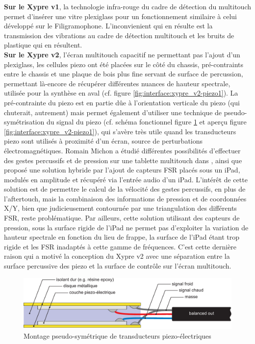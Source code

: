 \indent \textbf{Sur le Xypre v1}, la technologie infra-rouge du cadre de détection du multitouch permet d'insérer une vitre plexiglass pour un fonctionnement similaire à celui développé sur le Filigramophone. L'inconvienient qui en résulte est la transmission des vibrations au cadre de détection multitouch et les bruits de plastique qui en résultent.\\
\indent \textbf{Sur le Xypre v2}, l'écran multitouch capacitif ne permettant pas l'ajout d'un plexiglass, les cellules piezo ont été placées sur le côté du chassis, pré-contraints entre le chassis et une plaque de bois plus fine servant de surface de percussion, permettant là-encore de récupérer différentes nuances de hauteur spectrale, utilisée pour la synthèse en aval (cf. figure \ref{fig:interface:xypre_v2-piezo1}). La pré-contrainte du piezo est en partie dûe à l'orientation verticale du piezo (qui chuterait, autrement) mais permet également d'utiliser une technique de pseudo-symétrisation du signal du piezo (cf. schéma fonctionnel figure \ref{fig:interface:balancedPiezo} et aperçu figure \ref{fig:interface:xypre_v2-piezo1}), qui s'avère très utile quand les transducteurs piezo sont utilisés à proximité d'un écran, source de perturbations électromagnétiques. Romain Michon a étudié différentes possibilités d'effectuer des gestes percussifs et de pression sur une tablette multitouch dans \cite{michon_nuance_2016}, ainsi que proposé une solution hybride par l'ajout de capteurs \gls{FSR} placés sous un iPad, modulés en amplitude et récupéré via l'entrée audio d'un iPad. L'intérêt de cette solution est de permettre le calcul de la vélocité des gestes percussifs, en plus de l'aftertouch, mais la combinaison des informations de pression et de coordonnées X/Y, bien que judicieusement contournée par une triangulation des différents \gls{FSR}, reste problématique. Par ailleurs, cette solution utilisant des capteurs de pression, sous la surface rigide de l'iPad ne permet pas d'exploiter la variation de hauteur spectrale en fonction du lieu de frappe, la surface de l'iPad étant trop rigide et les \gls{FSR} inadaptés à cette gamme de fréquences. C'est cette dernière raison qui a motivé la conception du Xypre v2 avec une séparation entre la surface percussive des piezo et la surface de contrôle sur l'écran multitouch.

\begin{figure}[!htbp]
	\includegraphics[width=\textwidth]{gfx/05_interfaces/balancedPiezo.pdf}
	\caption{Montage pseudo-symétrique de transducteurs piezo-électriques}
	\label{fig:interface:balancedPiezo}
\end{figure}

